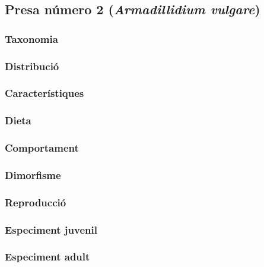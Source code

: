 \subsection{Presa número 2 (\textit{Armadillidium vulgare})}
\subsubsection{Taxonomia} 
\subsubsection{Distribució} 
\subsubsection{Característiques} 
\subsubsection{Dieta} 
\subsubsection{Comportament} 
\subsubsection{Dimorfisme} 
\subsubsection{Reproducció} 
\subsubsection{Especiment juvenil} 
\subsubsection{Especiment adult}
